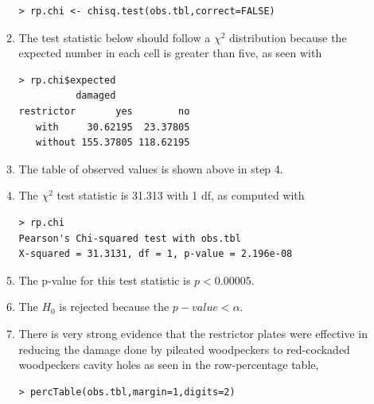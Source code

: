 \documentclass[10pt,openany]{book}\usepackage[]{graphicx}\usepackage[]{color}
\makeatletter
\newenvironment{kframe}{%
 \def\at@end@of@kframe{}%
 \ifinner\ifhmode%
  \def\at@end@of@kframe{\end{minipage}}%
  \begin{minipage}{\columnwidth}%
 \fi\fi%
 \def\FrameCommand##1{\hskip\@totalleftmargin \hskip-\fboxsep
 \colorbox{shadecolor}{##1}\hskip-\fboxsep
     \hskip-\linewidth \hskip-\@totalleftmargin \hskip\columnwidth}%
 \MakeFramed {\advance\hsize-\width
   \@totalleftmargin\z@ \linewidth\hsize
   \@setminipage}}%
 {\par\unskip\endMakeFramed%
 \at@end@of@kframe}
\newenvironment{knitrout}{}{} %
\makeatother
\begin{document}
\begin{itemize}
\begin{enumerate}
\begin{knitrout}
\color{fgcolor}\begin{kframe}
\begin{verbatim}
> rp.chi <- chisq.test(obs.tbl,correct=FALSE)
\end{verbatim}
\end{kframe}
\end{knitrout}
      \item The test statistic below should follow a $\chi^{2}$ distribution because the expected number in each cell is greater than five, as seen with
\begin{knitrout}
\color{fgcolor}\begin{kframe}
\begin{verbatim}
> rp.chi$expected
          damaged
restrictor       yes        no
   with     30.62195  23.37805
   without 155.37805 118.62195
\end{verbatim}
\end{kframe}
\end{knitrout}
      \item The table of observed values is shown above in step 4.
      \item The $\chi^{2}$ test statistic is 31.313 with 1 df, as computed with
\begin{knitrout}
\color{fgcolor}\begin{kframe}
\begin{verbatim}
> rp.chi
Pearson's Chi-squared test with obs.tbl 
X-squared = 31.3131, df = 1, p-value = 2.196e-08
\end{verbatim}
\end{kframe}
\end{knitrout}
      \item The p-value for this test statistic is $p<0.00005$.
      \item The $H_{0}$ is rejected because the $p-value <\alpha$.
      \item There is very strong evidence that the restrictor plates were effective in reducing the damage done by pileated woodpeckers to red-cockaded woodpeckers cavity holes as seen in the row-percentage table,
\begin{knitrout}
\color{fgcolor}\begin{kframe}
\begin{verbatim}
> percTable(obs.tbl,margin=1,digits=2)

\end{verbatim}
\end{kframe}
\end{knitrout}
\end{enumerate}
\end{itemize}
\end{document}
